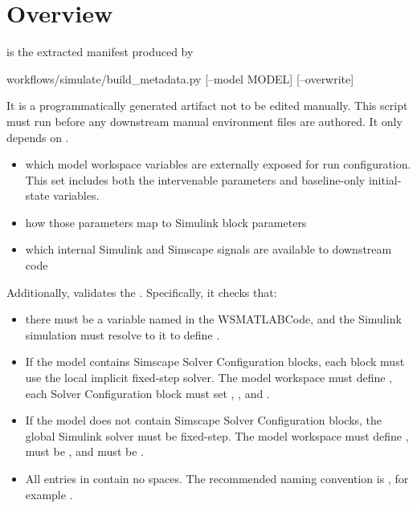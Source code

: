 \documentclass[11pt]{article}
\begin{document}
\label{docstart:simulink_generated_metadata_schema}

\section*{Overview}

 is the extracted manifest produced by
\begin{DocCode}
workflows/simulate/build_metadata.py [--model MODEL] [--overwrite]
\end{DocCode}
It is a programmatically generated artifact not to be edited manually.
This script must run before any downstream manual environment files are authored. It only depends on .
\begin{itemize}
\item which model workspace variables are externally exposed for \name{} run configuration. This set includes both the intervenable parameters and baseline-only initial-state variables.
\item how those parameters map to Simulink block parameters
\item which internal Simulink and Simscape signals are available to downstream code
\end{itemize}

Additionally,  validates the . Specifically, it checks that:
\begin{itemize}
  \item there must be a variable named  in the WSMATLABCode, and the Simulink simulation must resolve to it to define .
  \item If the model contains Simscape Solver Configuration blocks, each block must use the local implicit fixed-step solver. The model workspace must define , each Solver Configuration block must set , , and .
  \item If the model does not contain Simscape Solver Configuration blocks, the global Simulink solver must be fixed-step. The model workspace must define ,  must be , and  must be .
  \item All entries in  contain no spaces. The recommended naming convention is , for example .
\end{itemize}
\end{document}

